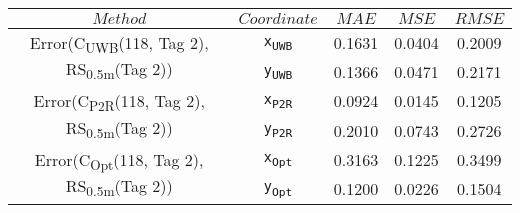 \begin{table}[h]
\centering
\begin{tabular}{|c|c|c|c|c|}
\hline
$Method$ & $Coordinate$ & $MAE$ & $MSE$ & $RMSE$ \\
\hline
\multirow{2}{*}{{\footnotesize Error(C\textsubscript{UWB}(118, Tag 2), RS\textsubscript{0.5m}(Tag 2))}} & \texttt{x\textsubscript{UWB}} & 0.1631 & 0.0404 & 0.2009 \\
& \texttt{y\textsubscript{UWB}} & 0.1366 & 0.0471 & 0.2171 \\
\hline
\multirow{2}{*}{{\footnotesize Error(C\textsubscript{P2R}(118, Tag 2), RS\textsubscript{0.5m}(Tag 2))}} & \texttt{x\textsubscript{P2R}} & 0.0924 & 0.0145 & 0.1205 \\
& \texttt{y\textsubscript{P2R}} & 0.2010 & 0.0743 & 0.2726 \\
\hline
\multirow{2}{*}{{\footnotesize Error(C\textsubscript{Opt}(118, Tag 2), RS\textsubscript{0.5m}(Tag 2))}} & \texttt{x\textsubscript{Opt}} & 0.3163 & 0.1225 & 0.3499 \\
& \texttt{y\textsubscript{Opt}} & 0.1200 & 0.0226 & 0.1504 \\
\hline
\end{tabular}
\end{table}
